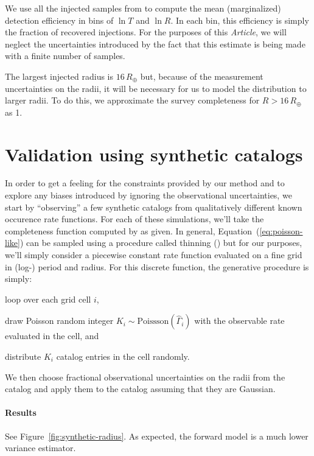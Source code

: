\documentclass[12pt,preprint]{aastex}
\newcommand{\paper}{\emph{Article}}
\newcommand{\Fig}[1]{Figure~\ref{fig:#1}}
\newcommand{\fig}[1]{\Fig{#1}}
\newcommand{\Eq}[1]{Equation~(\ref{eq:#1})}
\newcommand{\eq}[1]{\Eq{#1}}
\newcommand{\rate}{\ensuremath{\Gamma}}
\newcommand{\obs}[1]{\ensuremath{\hat{#1}}}
\newcommand{\radius}{\ensuremath{R}}
\newcommand{\period}{\ensuremath{T}}
\begin{document}
We use all the injected samples from \citet{petigura} to compute the mean
(marginalized) detection efficiency in bins of $\ln\period$ and $\ln\radius$.
In each bin, this efficiency is simply the fraction of recovered injections.
For the purposes of this \paper, we will neglect the uncertainties introduced
by the fact that this estimate is being made with a finite number of samples.

The largest injected radius is $16\,R_\oplus$ but, because of the measurement
uncertainties on the radii, it will be necessary for us to model the
distribution to larger radii.
To do this, we approximate the survey completeness for $\radius>16\,R_\oplus$
as 1.

\section{Validation using synthetic catalogs}

In order to get a feeling for the constraints provided by our method and to
explore any biases introduced by ignoring the observational uncertainties, we
start by ``observing'' a few synthetic catalogs from qualitatively different
known occurence rate functions.
For each of these simulations, we'll take the completeness function computed
by \citet{petigura} as given.
In general, \eq{poisson-like} can be sampled using a procedure called thinning
(\citealt{poisson}) but for our purposes, we'll simply consider a piecewise
constant rate function evaluated on a fine grid in (log-) period and radius.
For this discrete function, the generative procedure is simply:
\begin{enumerate}
{\item loop over each grid cell $i$,}
{\item draw Poisson random integer $K_i\sim\mathrm{Poissson}(\obs{\rate}_i)$
with the observable rate evaluated in the cell, and}
{\item distribute $K_i$ catalog entries in the cell randomly.}
\end{enumerate}
We then choose fractional observational uncertainties on the radii from the
\citet{petigura} catalog and apply them to the catalog assuming that they are
Gaussian.

\paragraph{Results}
See \fig{synthetic-radius}.
As expected, the forward model is a much lower variance estimator.
\end{document}

